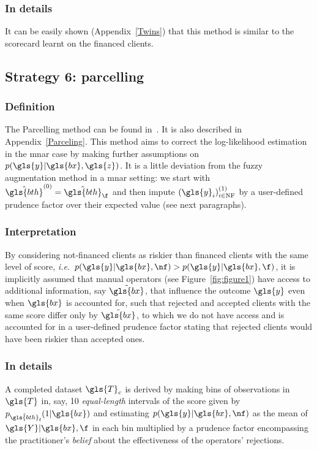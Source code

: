 \subsubsection{In details}
It can be easily shown (Appendix~\ref{Twins}) that
this method is similar to the scorecard learnt on the financed clients.

\subsection{Strategy 6: parcelling} \label{subsec:parcel}

\subsubsection{Definition}
The Parcelling method can be found in~\cite{saporta,banasik,RI6}. It is also described in Appendix~\ref{Parceling}. This method aims to correct the log-likelihood estimation in the \gls{mnar} case by making further assumptions on $p(\gls{y} | \gls{bx}, \gls{z})$. It is a little deviation from the fuzzy augmentation method in a \gls{mnar} setting: we start with $\hat{\gls{bth}}^{(0)} = \hat{\gls{bth}}_\f$ and then impute $(\gls{y}_i)_{i \in \text{NF}}^{(1)}$ by a user-defined prudence factor over their expected value (see next paragraphs).

\subsubsection{Interpretation}
By considering not-financed clients as riskier than financed clients with the same level of \gls{score}, \textit{i.e.}\ $p(\gls{y} | \gls{bx}, \nf) > p(\gls{y} | \gls{bx}, \f)$, it is implicitly assumed that manual operators (see Figure~\ref{fig:figure1}) have access to additional information, say $\tilde{\gls{bx}}$, that influence the outcome $\gls{y}$ even when $\gls{bx}$ is accounted for, such that rejected and accepted clients with the same \gls{score} differ only by $\tilde{\gls{bx}}$, to which we do not have access and is accounted for in a user-defined prudence factor stating that rejected clients would have been riskier than accepted ones.

\subsubsection{In details}
A completed dataset $\gls{T}_c$ is derived by making bins of observations in $\gls{T}$ in, say, 10 \textit{equal-length} intervals of the \gls{score} given by $p_{\hat{\gls{bth}}_\text{f}}(1 | \gls{bx})$ and estimating $p(\gls{y} | \gls{bx}, \nf)$ as the mean of $\gls{Y} | \gls{bx}, \f$ in each bin multiplied by a prudence factor encompassing the practitioner's \textit{belief} about the effectiveness of the operators' rejections.

